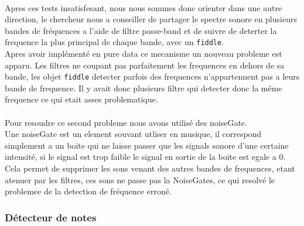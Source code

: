 \documentclass[a4paper, titlepage, oneside, 12pt]{article}%
\begin{document}
\paragraph{}
Apres ces tests insatisfesant, nous nous sommes donc orienter dans une autre direction, le chercheur nous a conseiller de partager le spectre sonore en plusieurs bandes de fréquences a l'aide de filtre passe-band et de suivre de deterter la frequence la plus principal de chaque bande, avec un \texttt{fiddle}.\\
Apres avoir implémenté en pure data ce mecanisme un nouveau probleme est apparu. Les filtres ne coupant pas parfaitement les frequences en dehors de sa bande, les objet \texttt{fiddle} detecter parfois des frequences n'appartennent pas a leurs bande de frequence. Il y avait donc plusieurs filtre qui detecter donc la même frequence ce qui etait asses problematique.\\

\paragraph{}
Pour resoudre ce second probleme nous avons utilisé des noiseGate.\\
Une noiseGate est un element souvant utliser en musique, il correspond simplement a un boite qui ne laisse passer que les signals sonore d'une certaine intensité, si le signal est trop faible le signal en sortie de la boite est egale a 0.
Cela permet de supprimer les sons venant des autres bandes de frequences, etant atenuer par les filtres, ces sons ne passe pas la NoiseGates, ce qui resolvé le problemee de la detection de fréquence erroné.

\subsubsection{Détecteur de notes}
\end{document}
